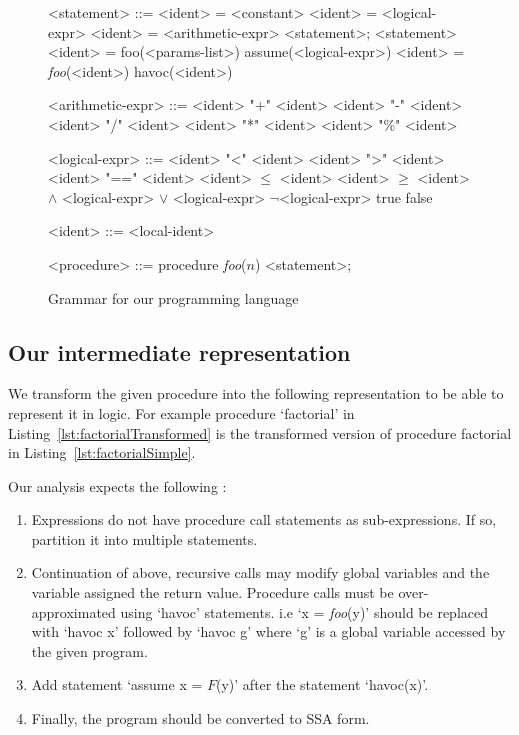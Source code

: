 \documentclass{llncs}
\newcommand{\foo}{\textit{foo}}
\newcommand{\F}{\mathit{F}}
\newcommand{\n}{\textit{n}}
\begin{document}
\begin{figure}[hb!]
  \begin{grammar}
    <statement> ::= <ident> = <constant>
    \alt <ident> = <logical-expr>
    \alt <ident> = <arithmetic-expr>
    \alt <statement>; <statement>
    \alt <ident> = foo(<params-list>)
    \alt assume(<logical-expr>)
    \alt <ident> = \foo(<ident>)
    \alt havoc(<ident>)


    <arithmetic-expr> ::= <ident> "+" <ident>
    \alt <ident> "-" <ident>
    \alt <ident> "/" <ident>
    \alt <ident> "*" <ident>
    \alt <ident> "\%" <ident>
 
    <logical-expr> ::= <ident> "<" <ident>
    \alt <ident> ">" <ident>
    \alt <ident> "==" <ident>
    \alt <ident> $\leq$ <ident>
    \alt <ident> $\geq$ <ident>
     $\wedge$ <logical-expr>
     $\vee$ <logical-expr>
    \alt $\neg$<logical-expr>
    \alt true
    \alt false

    <ident> ::= <local-ident>
    
    <procedure> ::= procedure \foo ($\n$) {<statement>;}
  \end{grammar}
  \caption{Grammar for our programming language}
  \label{fig:grammar}
\end{figure}

\subsection{Our intermediate representation}\label{sec:intermediate}
We transform the given procedure into the following representation to be able
to represent it in logic. For example procedure `factorial' in
Listing~\ref{lst:factorialTransformed} is the transformed version of
procedure factorial in Listing~\ref{lst:factorialSimple}.

Our analysis expects the following :
\begin{enumerate}
\item Expressions do not have procedure call statements as sub-expressions. If
  so, partition it into multiple statements.
\item Continuation of above, recursive calls may modify global
  variables and the variable assigned the return value. Procedure
  calls must be over-approximated using `havoc' statements. i.e `x =
  \foo(y)' should be replaced with `havoc x' followed by `havoc g'
  where `g' is a global variable accessed by the given program.
\item Add statement `assume x = $\F$(y)' after
  the statement `havoc(x)'.
\item Finally, the program should be converted to SSA form.
\end{enumerate}
\end{document}
